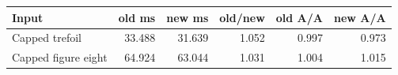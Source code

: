 \begin{center}
\small
\begin{tabular}{lrrrrr}
\toprule
Input & old ms & new ms & old/new & old A/A & new A/A\\
\midrule
Capped trefoil & 33.488 & 31.639 & 1.052 & 0.997 & 0.973\\
Capped figure eight & 64.924 & 63.044 & 1.031 & 1.004 & 1.015\\
\bottomrule
\end{tabular}
\end{center}
